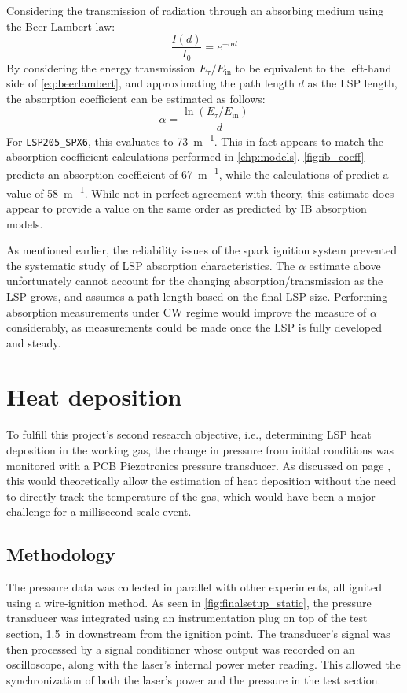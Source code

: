             Considering the transmission of radiation through an absorbing medium using the Beer-Lambert law:
            \begin{equation} \label{eq:beerlambert}
                \frac{I(d)}{I_0} = e^{-\alpha d}
            \end{equation}
            By considering the energy transmission $E_\tau/E_\mathrm{in}$ to be equivalent to the left-hand side of \autoref{eq:beerlambert}, and approximating the path length $d$ as the LSP length, the absorption coefficient can be estimated as follows:
            \begin{equation}
                \alpha = \frac{\ln{(E_\tau/E_\mathrm{in})}}{-d}
            \end{equation}
            For \texttt{LSP205\_SPX6}, this evaluates to \qty{73}{m^{-1}}. This in fact appears to match the absorption coefficient calculations performed in \autoref{chp:models}. \autoref{fig:ib_coeff} predicts an absorption coefficient of \qty{67}{m^{-1}}, while the calculations of \textcite{matsuiGeneratingConditionsArgon2019} predict a value of \qty{58}{m^{-1}}. While not in perfect agreement with theory, this estimate does appear to provide a value on the same order as predicted by IB absorption models.

            As mentioned earlier, the reliability issues of the spark ignition system prevented the systematic study of LSP absorption characteristics. The $\alpha$ estimate above unfortunately cannot account for the changing absorption/transmission as the LSP grows, and assumes a path length based on the final LSP size. Performing absorption measurements under CW regime would improve the measure of $\alpha$ considerably, as measurements could be made once the LSP is fully developed and steady.

    \section{Heat deposition}
        To fulfill this project's second research objective, i.e., determining LSP heat deposition in the working gas, the change in pressure from initial conditions was monitored with a PCB Piezotronics pressure transducer. As discussed on page \pageref{sec:design_pressuresensor}, this would theoretically allow the estimation of heat deposition without the need to directly track the temperature of the gas, which would have been a major challenge for a millisecond-scale event.

        \subsection{Methodology}
            The pressure data was collected in parallel with other experiments, all ignited using a wire-ignition method. As seen in \autoref{fig:finalsetup_static}, the pressure transducer was integrated using an instrumentation plug on top of the test section, \qty{1.5}{in} downstream from the ignition point. The transducer's signal was then processed by a signal conditioner whose output was recorded on an oscilloscope, along with the laser's internal power meter reading. This allowed the synchronization of both the laser's power and the pressure in the test section.

